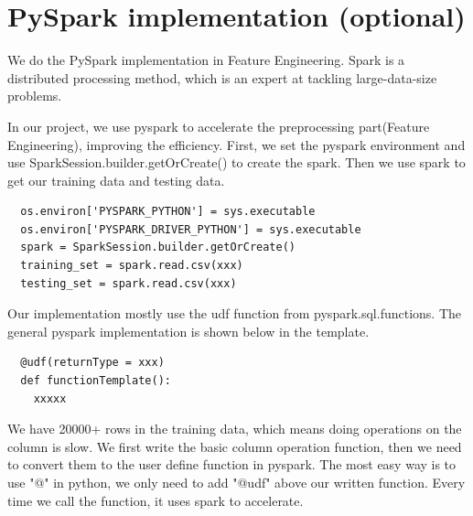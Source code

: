 \documentclass{article}
\begin{document}
\section{PySpark implementation (optional)}
We do the PySpark implementation in Feature Engineering. Spark is a distributed processing method, which is an expert at tackling large-data-size problems. 

In our project, we use pyspark to accelerate the preprocessing part(Feature Engineering), improving the efficiency. 
First, we set the pyspark environment and use SparkSession.builder.getOrCreate() to create the spark. Then we use spark to get our training data and testing data.
\begin{lstlisting}
  os.environ['PYSPARK_PYTHON'] = sys.executable
  os.environ['PYSPARK_DRIVER_PYTHON'] = sys.executable
  spark = SparkSession.builder.getOrCreate()
  training_set = spark.read.csv(xxx)
  testing_set = spark.read.csv(xxx)
\end{lstlisting}
Our implementation mostly use the udf function from pyspark.sql.functions. The general
pyspark implementation is shown below in the template.
\begin{lstlisting}
  @udf(returnType = xxx)
  def functionTemplate():
    xxxxx
\end{lstlisting}
We have 20000+ rows in the training data, which means doing operations on the column is slow.
We first write the basic column operation function, then we need to convert them to the user define function in pyspark. 
The most easy way is to use "@" in python, we only need to add "@udf" above our written function.
Every time we call the function, it uses spark to accelerate.
\end{document}
